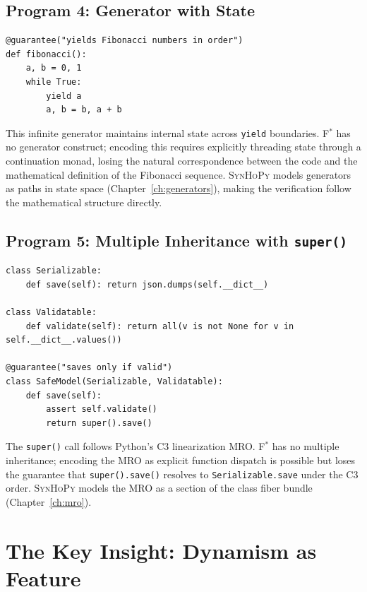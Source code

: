 \documentclass[11pt,a4paper]{report}
\theoremstyle{definition}
\theoremstyle{plain}
\newcommand{\fstar}{F$^{*}$}
\newcommand{\synhopy}{\textsc{SynHoPy}}
\begin{document}
\subsection{Program 4: Generator with State}

\begin{lstlisting}[style=synhopy]
@guarantee("yields Fibonacci numbers in order")
def fibonacci():
    a, b = 0, 1
    while True:
        yield a
        a, b = b, a + b
\end{lstlisting}

This infinite generator maintains internal state across
\lstinline[style=python]{yield} boundaries.  \fstar{} has no
generator construct; encoding this requires explicitly
threading state through a continuation monad, losing the
natural correspondence between the code and the mathematical
definition of the Fibonacci sequence.
\synhopy{} models generators as paths in state space
(Chapter~\ref{ch:generators}), making the verification
follow the mathematical structure directly.

\subsection{Program 5: Multiple Inheritance with \texttt{super()}}

\begin{lstlisting}[style=synhopy]
class Serializable:
    def save(self): return json.dumps(self.__dict__)

class Validatable:
    def validate(self): return all(v is not None for v in self.__dict__.values())

@guarantee("saves only if valid")
class SafeModel(Serializable, Validatable):
    def save(self):
        assert self.validate()
        return super().save()
\end{lstlisting}

The \lstinline[style=python]{super()} call follows Python's C3
linearization MRO.  \fstar{} has no multiple inheritance; encoding
the MRO as explicit function dispatch is possible but loses the
guarantee that \lstinline[style=python]{super().save()} resolves
to \lstinline[style=python]{Serializable.save} under the C3 order.
\synhopy{} models the MRO as a section of the class fiber bundle
(Chapter~\ref{ch:mro}).

\section{The Key Insight: Dynamism as Feature}
\label{sec:key-insight}
\end{document}
